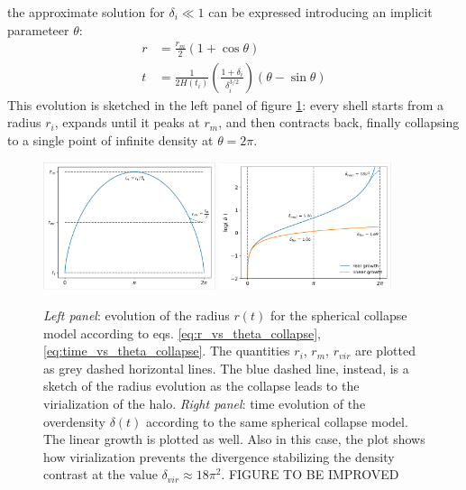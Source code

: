 the approximate solution for $\delta_i\ll 1$ can be expressed introducing an implicit parameteer $\theta$:
  \begin{align}
   r &= \frac{r_m}{2} (1+\cos\theta) \label{eq:r_vs_theta_collapse}\\
   t &= \frac{1}{2H(t_i)}\left(\frac{1+\delta_i}{\delta_i^{3/2}}\right)(\theta-\sin\theta) \label{eq:time_vs_theta_collapse}
  \end{align}
  This evolution is sketched in the left panel of figure \ref{fig:collapse}: every shell starts from a radius $r_i$, expands until it peaks at $r_m$, and then contracts back, finally collapsing to a single point of infinite density at $\theta=2\pi$. 
 
   \begin{figure}
	\centering
	\includegraphics[width=0.45\textwidth]{plots/radius_collapse.PNG}
	\includegraphics[width=0.45\textwidth]{plots/density_collapse.PNG}
	\caption{\textit{Left panel}: evolution of the radius $r(t)$ for the spherical collapse model according to eqs. \ref{eq:r_vs_theta_collapse},\ref{eq:time_vs_theta_collapse}. The quantities $r_i$, $r_m$, $r_{vir}$ are plotted as grey dashed horizontal lines. The blue dashed line, instead, is a sketch of the radius evolution as the collapse leads to the virialization of the halo. \textit{Right panel}: time evolution of the overdensity $\delta(t)$ according to the same spherical collapse model. The linear growth is plotted as well. Also in this case, the plot shows how virialization prevents the divergence stabilizing the density contrast at the value $\delta_{vir}\approx 18\pi^2$. FIGURE TO BE IMPROVED
	}
	\label{fig:collapse}
    \end{figure}
    
